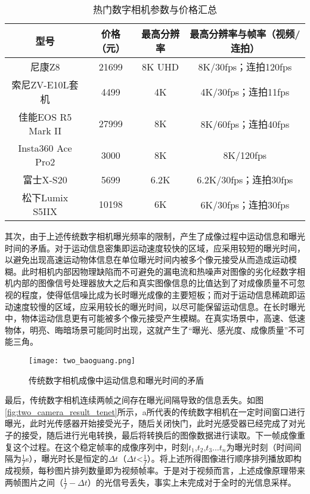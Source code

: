 \begin{table}[htbp]
  \centering
  \caption{热门数字相机参数与价格汇总}
  \label{tab:camera}
  \begin{adjustbox}{width=\textwidth}
    \begin{tabular}{cccc}
      \toprule
      \textbf{型号}       & \textbf{价格（元）} & \textbf{最高分辨率} & \textbf{最高分辨率与帧率（视频/连拍）} \\
      \midrule
      尼康Z8              & 21699          & 8K UHD         & 8K/30fps；连拍120fps        \\
      索尼ZV-E10L套机       & 4499           & 4K             & 4K/30fps；连拍11fps         \\
      佳能EOS R5 Mark II  & 27999          & 8K             & 8K/60fps；连拍40fps         \\
      Insta360 Ace Pro2 & 3000           & 8K             & 8K/120fps                \\
      富士X-S20           & 5699           & 6.2K           & 6.2K/30fps；连拍30fps       \\
      松下Lumix S5IIX     & 10198          & 6K             & 6K/30fps；连拍30fps         \\
      \bottomrule
    \end{tabular}
  \end{adjustbox}
\end{table}
其次，由于上述传统数字相机曝光频率的限制，产生了成像过程中运动信息和曝光时间的矛盾。对于运动信息密集即运动速度较快的区域，应采用较短的曝光时间，以避免出现高速运动物体信息在单位曝光时间内被多个像元接受从而造成运动模糊。此时相机内部因物理缺陷而不可避免的漏电流和热噪声对图像的劣化经数字相机内部的图像信号处理器放大之后和真实图像信息的比值达到了对成像质量不可忽视的程度，使得低信噪比成为长时曝光成像的主要短板；而对于运动信息稀疏即运动速度较慢的区域，应采用较长的曝光时间，以尽可能保留运动信息。在长时曝光中，物体运动信息更有可能被多个像元接受产生模糊。在真实场景中，高速、低速物体，明亮、晦暗场景可能同时出现，这就产生了“曝光、感光度、成像质量”不可能三角。

\begin{figure}[ht]
  \centering
  \texttt{[image: two\_baoguang.png]}
  \caption{传统数字相机成像中运动信息和曝光时间的矛盾}
  \label{fig:two_baoguang}
\end{figure}

最后，传统数字相机连续两帧之间存在曝光间隔导致的信息丢失。如图\ref{fig:two_camera_result_tenet}所示，a所代表的传统数字相机在一定时间窗口进行曝光，此时光传感器开始接受光子，随后关闭快门，此时光感受器已经完成了对光子的接受，随后进行光电转换，最后将转换后的图像数据进行读取。下一帧成像重复这个过程。在这个稳定帧率的成像序列中，时刻$t_1$,$t_2$,$t_3$...$t_n$为曝光时刻（时间间隔为$\frac{1}{f}$s），曝光时长是恒定的$\Delta t$（$\Delta t$<$\frac{1}{f}$）。将上述所得图像进行顺序排列播放即构成视频，每秒图片排列数量即为视频帧率。于是对于视频而言，上述成像原理带来两帧图片之间（$\frac{1}{f}-\Delta t$）的光信号丢失，事实上未完成对于全时的光信息采样。

